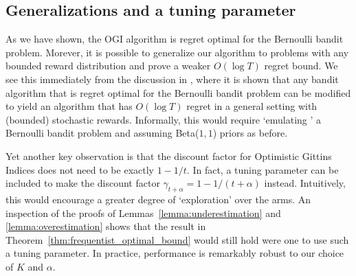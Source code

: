 \subsection{Generalizations and a tuning parameter}
As we have shown, the OGI algorithm is regret optimal for the Bernoulli bandit problem. Morever, it is possible to generalize our algorithm to problems with any bounded reward distribution and prove a weaker $O(\log T)$ regret bound. We see this immediately from the discussion in \cite{agrawalanalysis}, where it is shown that any bandit algorithm that is regret optimal for the Bernoulli bandit problem can be modified to yield an algorithm that has $O(\log T)$ regret in a general setting with (bounded) stochastic rewards. Informally, this would require `emulating ' a Bernoulli bandit problem and assuming Beta($1,1$) priors as before.%

Yet another key observation is that the discount factor for Optimistic Gittins Indices does not need to be exactly $1-1/t$. In fact, a tuning parameter can be included to make the discount factor $\gamma_{t+\alpha} = 1-1/(t+\alpha)$ instead. Intuitively, this would encourage a greater degree of `exploration' over the arms. An inspection of the proofs of Lemmas~\ref{lemma:underestimation} and \ref{lemma:overestimation} shows that the result in Theorem~\ref{thm:frequentist_optimal_bound} would still hold were one to use such a tuning parameter. In practice, performance is remarkably robust to our choice of $K$ and $\alpha$.